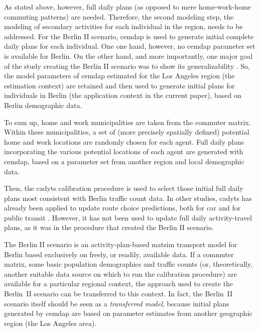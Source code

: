 As stated above, however, full daily plans (as opposed to mere home-work-home commuting patterns) are needed. Therefore, the second modeling step, the modeling of secondary activities for each individual in the region, needs to be addressed. For the Berlin II scenario, \gls{cemdap} is used to generate initial complete daily plans for each individual. One one hand, however, no \gls{cemdap} parameter set is available for Berlin. On the other hand, and more importantly, one major goal of the study creating the Berlin II scenario was to show its generalizability \citep{ZiemkeNagelBhatIntegratingCemdapMatsimTransferability}. So, the model parameters of \gls{cemdap} estimated for the Los Angeles region (the estimation context) are retained and then used to generate initial plans for individuals in Berlin (the application context in the current paper), based on Berlin demographic data.

To sum up, home and work municipalities are taken from the commuter matrix. Within these municipalities, a set of (more precisely spatially defined) potential home and work locations are randomly chosen for each agent. Full daily plans incorporating the various potential locations of each agent are generated with \gls{cemdap}, based on a parameter set from another region and local demographic data.

Then, the \gls{cadyts} calibration procedure is used to select those initial full daily plans most consistent with Berlin traffic count data. In other studies, \gls{cadyts} has already been applied to update route choice predictions, both for car \citep{FloetteroedChenEtAl2011BehavioralCalibAndAnaNETS} and for public transit \citep{MoyoNagelptNetCalibration}. However, it has not been used to update full daily activity-travel plans, as it was in the procedure that created the Berlin II scenario. 

The Berlin II scenario is an activity-plan-based \gls{matsim} transport model for Berlin based exclusively on freely, or readily, available data. If a commuter matrix, some basic population demographics and traffic counts (or, theoretically, another suitable data source on which to run the calibration procedure) are available for a particular regional context, the approach used to create the Berlin~II scenario can be transferred to this context. In fact, the Berlin~II scenario itself should be seen as a \emph{transferred model}, because initial plans generated by \gls{cemdap} are based on parameter estimates from another geographic region (the Los Angeles area).


